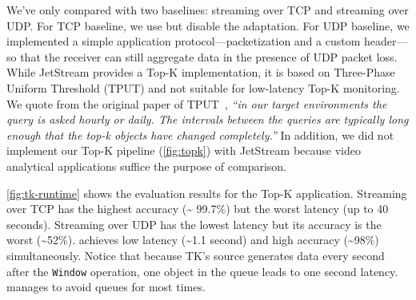 \documentclass[twocolumn]{article}
\begin{document}
We've only compared \sysname{} with two baselines: streaming over TCP and
streaming over UDP. For TCP baseline, we use \sysname{} but disable the
adaptation. For UDP baseline, we implemented a simple application
protocol---packetization and a custom header---so that the receiver can still
aggregate data in the presence of UDP packet loss. While JetStream provides a
Top-K implementation, it is based on Three-Phase Uniform Threshold (TPUT) and
not suitable for low-latency Top-K monitoring. We quote from the original paper
of TPUT~\cite{cao2004efficient}, \textit{``in our target environments the query
  is asked hourly or daily. The intervals between the queries are typically long
  enough that the top-k objects have changed completely.''} In addition, we did
not implement our Top-K pipeline (\autoref{fig:topk}) with JetStream because
video analytical applications suffice the purpose of comparison.

\autoref{fig:tk-runtime} shows the evaluation results for the Top-K
application. Streaming over TCP has the highest accuracy (\textasciitilde
99.7\%) but the worst latency (up to 40 seconds). Streaming over UDP has the
lowest latency but its accuracy is the worst (\textasciitilde 52\%). \sysname{}
achieves low latency (\textasciitilde 1.1 second) and high accuracy
(\textasciitilde 98\%) simultaneously. Notice that because TK's source generates
data every second after the \texttt{Window} operation, one object in the queue
leads to one second latency. \sysname{} manages to avoid queues for most times.

%
\end{document}
